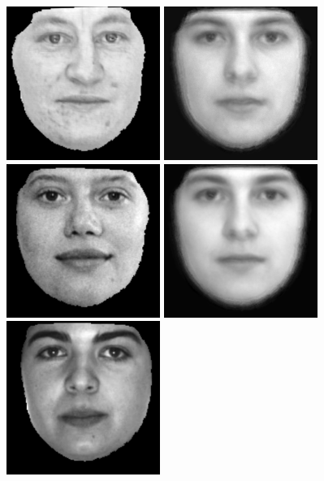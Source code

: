 \documentclass[12pt]{article}
\begin{document}
\begin{center}
    \includegraphics[width=5cm]{output_part2/original_2.png}
    \includegraphics[width=5cm]{output_part2/reconstruct_2.png}
    \includegraphics[width=5cm]{output_part2/original_3.png}
    \includegraphics[width=5cm]{output_part2/reconstruct_3.png}
    \includegraphics[width=5cm]{output_part2/original_4.png}

\end{center}
\end{document}
